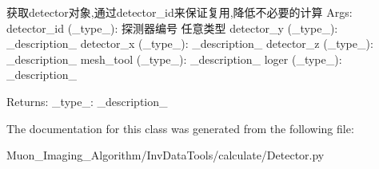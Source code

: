 \begin{DoxyVerb}获取detector对象,通过detector_id来保证复用,降低不必要的计算
Args:
    detector_id (_type_): 探测器编号 任意类型
    detector_y (_type_): _description_
    detector_x (_type_): _description_
    detector_z (_type_): _description_
    mesh_tool (_type_): _description_
    loger (_type_): _description_

Returns:
    _type_: _description_
\end{DoxyVerb}
 

The documentation for this class was generated from the following file\+:\begin{DoxyCompactItemize}
\item 
Muon\+\_\+\+Imaging\+\_\+\+Algorithm/\+Inv\+Data\+Tools/calculate/Detector.\+py\end{DoxyCompactItemize}

